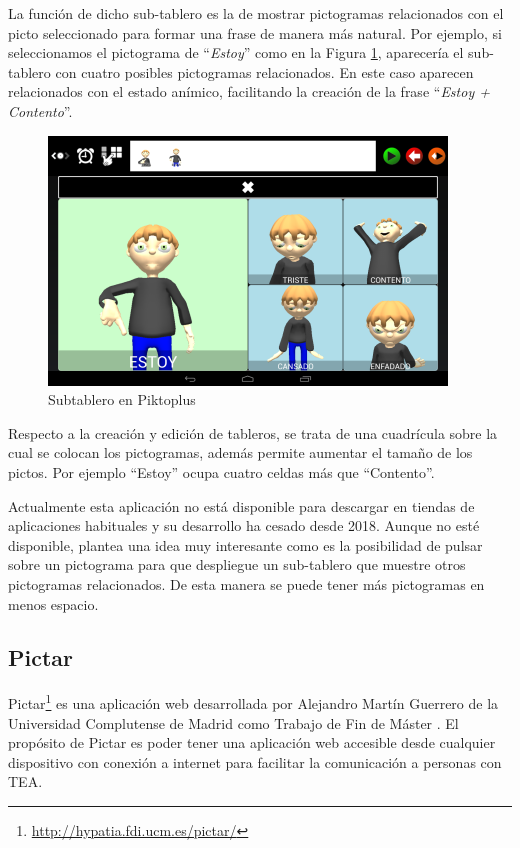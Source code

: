 La función de dicho sub-tablero es la de mostrar pictogramas relacionados con el picto seleccionado para formar una frase de manera más natural. Por ejemplo, si seleccionamos el pictograma de “\textit{Estoy}” como en la Figura  \ref{fig:piktoplus2}, aparecería el sub-tablero con cuatro posibles pictogramas relacionados. En este caso aparecen relacionados con el estado anímico, facilitando la creación de la frase “\textit{Estoy + Contento}”. 




\begin{figure}[h!]
	\centering
	\includegraphics[width=0.5\linewidth]{Imagenes/Bitmap/Piktoplus2}
	\caption[Subtablero Piktoplus]{Subtablero en Piktoplus}
	\label{fig:piktoplus2}
\end{figure}


Respecto a la creación y edición de tableros, se trata de una cuadrícula sobre la cual se colocan los pictogramas, además permite aumentar el tamaño de los pictos. Por ejemplo “Estoy” ocupa cuatro celdas más que “Contento”. 

Actualmente esta aplicación no está disponible para descargar en tiendas de aplicaciones habituales y su desarrollo ha cesado desde 2018. Aunque no esté disponible, plantea una idea muy interesante como es la posibilidad de pulsar sobre un pictograma para que despliegue un sub-tablero que muestre otros pictogramas relacionados. De esta manera se puede tener más pictogramas en menos espacio.

\subsection{Pictar}
\label{cap2:sec:pictar}
Pictar\footnote{\url{http://hypatia.fdi.ucm.es/pictar/}} es una aplicación web desarrollada por Alejandro Martín Guerrero de la Universidad Complutense de Madrid como Trabajo de Fin de Máster \citep{TFMPictar}. El propósito de Pictar es poder tener una aplicación web accesible desde cualquier dispositivo con conexión a internet para facilitar la comunicación a personas con TEA.

